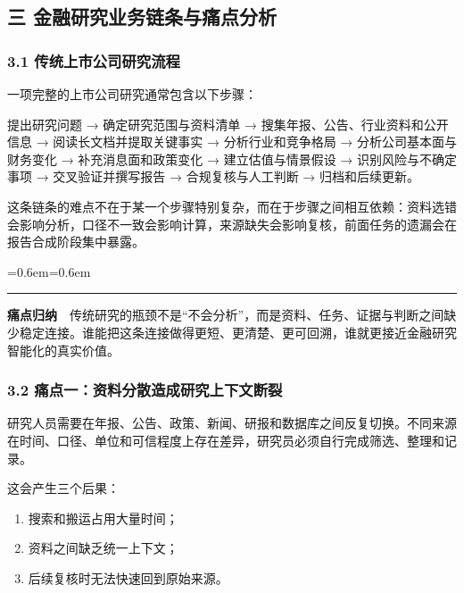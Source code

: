 \documentclass[a4paper,12pt,fontset=none]{ctexart}
\renewenvironment{quote}{%
  \par\vspace{0.45em}%
  \leftskip=0.6em\rightskip=0.6em
  \noindent\color{icbcred}\rule{3pt}{1.15em}\hspace{0.55em}%
  \small\color{deepnavy!85}\itshape\ignorespaces
}{%
  \par\vspace{0.45em}%
}
\begin{document}
\subsection{三
金融研究业务链条与痛点分析}\label{ux4e09-ux91d1ux878dux7814ux7a76ux4e1aux52a1ux94feux6761ux4e0eux75dbux70b9ux5206ux6790}

\subsubsection{3.1
传统上市公司研究流程}\label{ux4f20ux7edfux4e0aux5e02ux516cux53f8ux7814ux7a76ux6d41ux7a0b}

一项完整的上市公司研究通常包含以下步骤：

提出研究问题 → 确定研究范围与资料清单 →
搜集年报、公告、行业资料和公开信息 → 阅读长文档并提取关键事实 →
分析行业和竞争格局 → 分析公司基本面与财务变化 → 补充消息面和政策变化 →
建立估值与情景假设 → 识别风险与不确定事项 → 交叉验证并撰写报告 →
合规复核与人工判断 → 归档和后续更新。

这条链条的难点不在于某一个步骤特别复杂，而在于步骤之间相互依赖：资料选错会影响分析，口径不一致会影响计算，来源缺失会影响复核，前面任务的遗漏会在报告合成阶段集中暴露。

\begin{quote}
\textbf{痛点归纳}　传统研究的瓶颈不是``不会分析''，而是资料、任务、证据与判断之间缺少稳定连接。谁能把这条连接做得更短、更清楚、更可回溯，谁就更接近金融研究智能化的真实价值。
\end{quote}

\subsubsection{3.2
痛点一：资料分散造成研究上下文断裂}\label{ux75dbux70b9ux4e00ux8d44ux6599ux5206ux6563ux9020ux6210ux7814ux7a76ux4e0aux4e0bux6587ux65adux88c2}

研究人员需要在年报、公告、政策、新闻、研报和数据库之间反复切换。不同来源在时间、口径、单位和可信程度上存在差异，研究员必须自行完成筛选、整理和记录。

这会产生三个后果：

\begin{enumerate}
\def\labelenumi{\arabic{enumi}.}
\tightlist
\item
  搜索和搬运占用大量时间；
\item
  资料之间缺乏统一上下文；
\item
  后续复核时无法快速回到原始来源。
\end{enumerate}
\end{document}
